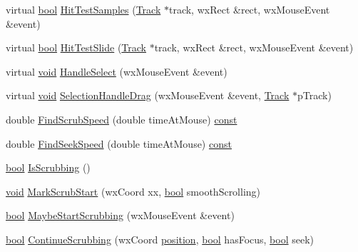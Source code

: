\begin{DoxyCompactItemize}
\item 
virtual \hyperlink{mac_2config_2i386_2lib-src_2libsoxr_2soxr-config_8h_abb452686968e48b67397da5f97445f5b}{bool} \hyperlink{class_track_panel_ac73b0e8459c26a88fd13c748093be972}{Hit\+Test\+Samples} (\hyperlink{class_track}{Track} $\ast$track, wx\+Rect \&rect, wx\+Mouse\+Event \&event)
\item 
virtual \hyperlink{mac_2config_2i386_2lib-src_2libsoxr_2soxr-config_8h_abb452686968e48b67397da5f97445f5b}{bool} \hyperlink{class_track_panel_a99f1ae26f8fb6694cba3a5b58c7a1e87}{Hit\+Test\+Slide} (\hyperlink{class_track}{Track} $\ast$track, wx\+Rect \&rect, wx\+Mouse\+Event \&event)
\item 
virtual \hyperlink{sound_8c_ae35f5844602719cf66324f4de2a658b3}{void} \hyperlink{class_track_panel_a16fa8c66608b0fc61d96d855b77f589e}{Handle\+Select} (wx\+Mouse\+Event \&event)
\item 
virtual \hyperlink{sound_8c_ae35f5844602719cf66324f4de2a658b3}{void} \hyperlink{class_track_panel_a256e9294a7633273eb11bf4f5bc0d4fe}{Selection\+Handle\+Drag} (wx\+Mouse\+Event \&event, \hyperlink{class_track}{Track} $\ast$p\+Track)
\item 
double \hyperlink{class_track_panel_ada36085585f713f52e23065a1d03a16e}{Find\+Scrub\+Speed} (double time\+At\+Mouse) \hyperlink{getopt1_8c_a2c212835823e3c54a8ab6d95c652660e}{const} 
\item 
double \hyperlink{class_track_panel_a700982026d45a87971910757d0e9b730}{Find\+Seek\+Speed} (double time\+At\+Mouse) \hyperlink{getopt1_8c_a2c212835823e3c54a8ab6d95c652660e}{const} 
\item 
\hyperlink{mac_2config_2i386_2lib-src_2libsoxr_2soxr-config_8h_abb452686968e48b67397da5f97445f5b}{bool} \hyperlink{class_track_panel_a829be88d76a1848e5b7dae58220a1a8d}{Is\+Scrubbing} ()
\item 
\hyperlink{sound_8c_ae35f5844602719cf66324f4de2a658b3}{void} \hyperlink{class_track_panel_ab8a413612048411de7c8f9624141afd9}{Mark\+Scrub\+Start} (wx\+Coord xx, \hyperlink{mac_2config_2i386_2lib-src_2libsoxr_2soxr-config_8h_abb452686968e48b67397da5f97445f5b}{bool} smooth\+Scrolling)
\item 
\hyperlink{mac_2config_2i386_2lib-src_2libsoxr_2soxr-config_8h_abb452686968e48b67397da5f97445f5b}{bool} \hyperlink{class_track_panel_a68761c50276e717cca92431728377760}{Maybe\+Start\+Scrubbing} (wx\+Mouse\+Event \&event)
\item 
\hyperlink{mac_2config_2i386_2lib-src_2libsoxr_2soxr-config_8h_abb452686968e48b67397da5f97445f5b}{bool} \hyperlink{class_track_panel_a9b004c2baf47cbe9013b27c19dd164b9}{Continue\+Scrubbing} (wx\+Coord \hyperlink{structposition}{position}, \hyperlink{mac_2config_2i386_2lib-src_2libsoxr_2soxr-config_8h_abb452686968e48b67397da5f97445f5b}{bool} has\+Focus, \hyperlink{mac_2config_2i386_2lib-src_2libsoxr_2soxr-config_8h_abb452686968e48b67397da5f97445f5b}{bool} seek)

\end{DoxyCompactItemize}

